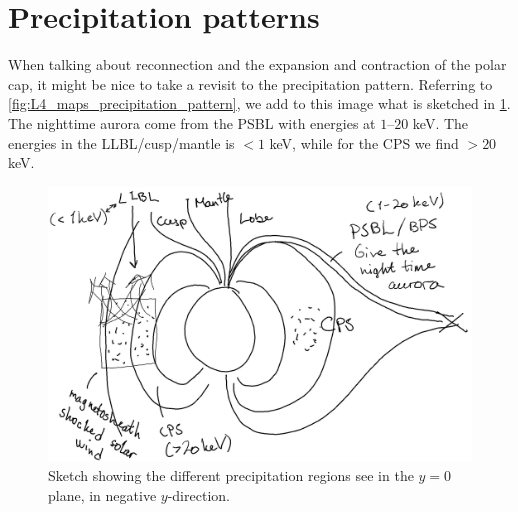 \section{Precipitation patterns}
When talking about reconnection and the expansion and contraction of the polar cap, it might be nice to take a revisit to the precipitation pattern. Referring to \cref{fig:L4_maps_precipitation_pattern}, we add to this image what is sketched in \cref{fig:L13_regions_of_precipitation}. The nighttime aurora come from the PSBL with energies at \(1\)--\(20\) keV. The energies in the LLBL/cusp/mantle is \(<1\) keV, while for the CPS we find \(>20\) keV.
\begin{figure}[t]
    \centering
    \includegraphics[width=.8\linewidth]{bilder/L13_regions_of_precipitation.png}
    \caption{Sketch showing the different precipitation regions see in the \(y=0\) plane, in negative \(y\)-direction.}\label{fig:L13_regions_of_precipitation}
\end{figure}
